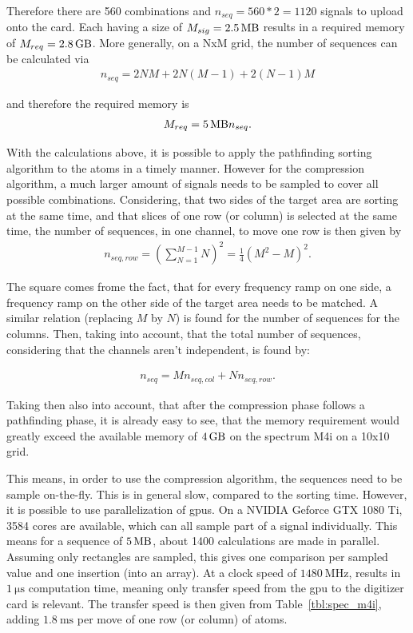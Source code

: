 Therefore there are 560 combinations and $n_{seq} = 560*2=1120$ signals to upload onto the card. Each having a size of $M_{sig} = \SI{2.5}{\mega\byte}$ results in a required memory of $M_{req}=\SI{2.8}{\giga\byte}$. More generally, on a NxM grid, the number of sequences can be calculated via
\begin{align}
	n_{seq} = 2 N M + 2 N (M-1) + 2 (N-1) M
\end{align}

and therefore the required memory is
\begin{align}
	M_{req} = \SI{5}{\mega\byte} n_{seq}.
\end{align}

With the calculations above, it is possible to apply the pathfinding sorting algorithm to the atoms in a timely manner. However for the compression algorithm, a much larger amount of signals needs to be sampled to cover all possible combinations. Considering, that two sides of the target area are sorting at the same time, and that slices of one row (or column) is selected at the same time, the number of sequences, in one channel, to move one row is then given by
\begin{align}
	n_{seq,row} = \left(\sum_{N=1}^{M-1} N\right)^2 = \frac{1}{4} (M^2-M)^2.
\end{align}

The square comes frome the fact, that for every frequency ramp on one side, a frequency ramp on the other side of the target area needs to be matched. A similar relation (replacing $M$ by $N$) is found for the number of sequences for the columns. Then, taking into account, that the total number of sequences, considering that the channels aren't independent, is found by:

\begin{align}
	n_{seq} = M n_{seq,col} + N n_{seq,row}.
\end{align}

Taking then also into account, that after the compression phase follows a pathfinding phase, it is already easy to see, that the memory requirement would greatly exceed the available memory of $\SI{4}{\giga\byte}$ on the spectrum M4i on a 10x10 grid.

This means, in order to use the compression algorithm, the sequences need to be sample on-the-fly. This is in general slow, compared to the sorting time. However, it is possible to use parallelization of \acp{gpu}. On a NVIDIA Geforce GTX 1080 Ti, 3584 cores are available, which can all sample part of a signal individually. This means for a sequence of $\SI{5}{\mega\byte}$, about 1400 calculations are made in parallel. Assuming only rectangles are sampled, this gives one comparison per sampled value and one insertion (into an array). At a clock speed of $\SI{1480}{\mega\hertz}$, results in $\SI{1}{\micro\second}$ computation time, meaning only transfer speed from the \ac{gpu} to the digitizer card is relevant. The transfer speed is then given from Table~\ref{tbl:spec_m4i}, adding $\SI{1.8}{\milli\second}$ per move of one row (or column) of atoms.

